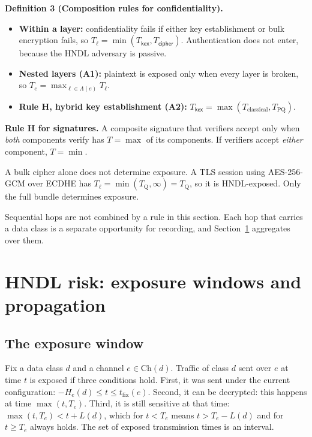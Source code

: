 \documentclass[conference]{IEEEtran}
\newcommand{\Tq}{T_{\mathrm{Q}}}
\newcommand{\tfix}{t_{\mathrm{fix}}}
\newcommand{\Ch}{\mathrm{Ch}}
\providecommand{\lt}{}\renewcommand{\lt}{<}
\providecommand{\gt}{}\renewcommand{\gt}{>}
\newenvironment{envblock}{\par\smallskip\noindent\ignorespaces}{\par\smallskip}
\begin{document}
\begin{envblock}

\textbf{Definition 3 (Composition rules for confidentiality).}

\begin{itemize}
\item \textbf{Within a layer:} confidentiality fails if either key establishment or bulk encryption fails, so $T_\ell = \min(T_{\mathsf{kex}}, T_{\mathsf{cipher}})$. Authentication does not enter, because the HNDL adversary is passive.
\item \textbf{Nested layers (A1):} plaintext is exposed only when every layer is broken, so $T_e = \max_{\ell \in \Lambda(e)} T_\ell$.
\item \textbf{Rule H, hybrid key establishment (A2):} $T_{\mathsf{kex}} = \max(T_{\mathrm{classical}}, T_{\mathrm{PQ}})$.
\end{itemize}

\textbf{Rule H for signatures.} A composite signature that verifiers accept only when \emph{both} components verify has $T = \max$ of its components. If verifiers accept \emph{either} component, $T = \min$.
\end{envblock}

A bulk cipher alone does not determine exposure. A TLS session using AES-256-GCM over ECDHE has $T_\ell = \min(\Tq, \infty) = \Tq$, so it is HNDL-exposed. Only the full bundle determines exposure.

Sequential hops are not combined by a rule in this section. Each hop that carries a data class is a separate opportunity for recording, and Section~\ref{sec:6} aggregates over them.

\section{HNDL risk: exposure windows and propagation}\label{sec:6}

\subsection{The exposure window}\label{sec:6.1}

Fix a data class $d$ and a channel $e \in \Ch(d)$. Traffic of class $d$ sent over $e$ at time $t$ is exposed if three conditions hold. First, it was sent under the current configuration: $-H_e(d) \le t \le \tfix(e)$. Second, it can be decrypted: this happens at time $\max(t, T_e)$. Third, it is still sensitive at that time: $\max(t, T_e) \lt t + L(d)$, which for $t \lt T_e$ means $t \gt T_e - L(d)$ and for $t \ge T_e$ always holds. The set of exposed transmission times is an interval.
\end{document}
